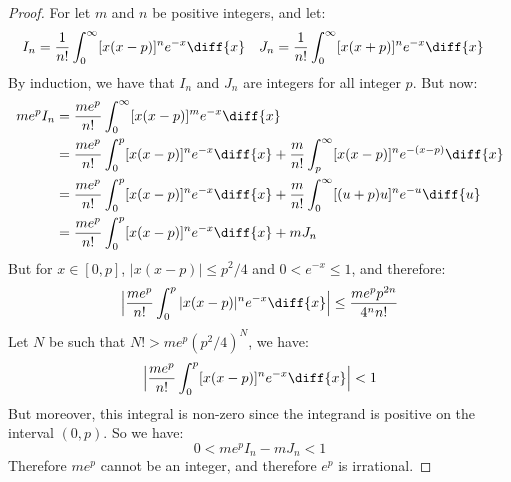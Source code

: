 \documentclass[crop=false,class=book,oneside]{standalone}
\begin{document}
            \begin{proof}
                For let $m$ and $n$ be positive integers, and let:
                \begin{align*}
                    I_{n}
                    &=\frac{1}{n!}
                        \int_{0}^{\infty}[x(x-p)]^{n}e^{-x}\diff{x}
                    &
                    J_{n}
                    &=\frac{1}{n!}
                        \int_{0}^{\infty}[x(x+p)]^{n}e^{-x}\diff{x}
                \end{align*}
                By induction, we have that $I_{n}$ and $J_{n}$ are
                integers for all integer $p$. But now:
                \begin{align*}
                    me^{p}I_{n}
                    &=\frac{me^{p}}{n!}
                        \int_{0}^{\infty}[x(x-p)]^{m}e^{-x}\diff{x}\\
                    &=\frac{me^{p}}{n!}
                        \int_{0}^{p}[x(x-p)]^{n}e^{-x}\diff{x}
                     +\frac{m}{n!}
                        \int_{p}^{\infty}[x(x-p)]^{n}e^{-(x-p)}\diff{x}\\
                    &=\frac{me^{p}}{n!}
                        \int_{0}^{p}[x(x-p)]^{n}e^{-x}\diff{x}+
                        \frac{m}{n!}
                            \int_{0}^{\infty}[(u+p)u]^{n}e^{-u}\diff{u}\\
                    &=\frac{me^{p}}{n!}
                        \int_{0}^{p}[x(x-p)]^{n}e^{-x}\diff{x}+mJ_{n}
                \end{align*}
                But for $x\in[0,p]$, $|x(x-p)|\leq{p^{2}/4}$ and
                $0<e^{-x}\leq{1}$, and therefore:
                \begin{equation*}
                    \Big|\frac{me^{p}}{n!}
                        \int_{0}^{p}|x(x-p)|^{n}e^{-x}\diff{x}\Big|
                    \leq\frac{me^{p}p^{2n}}{4^{n}n!}
                \end{equation*}
                Let $N$ be such that $N!>me^{p}(p^{2}/4)^{N}$, we have:
                \begin{equation*}
                    \Big|\frac{me^{p}}{n!}
                        \int_{0}^{p}[x(x-p)]^{n}e^{-x}\diff{x}\Big|<1
                \end{equation*}
                But moreover, this integral is non-zero since
                the integrand is positive on the interval $(0,p)$.
                So we have:
                \begin{equation*}
                    0<me^{p}I_{n}-mJ_{n}<1
                \end{equation*}
                Therefore $me^{p}$ cannot be an integer, and therefore
                $e^{p}$ is irrational.
            \end{proof}
\end{document}
